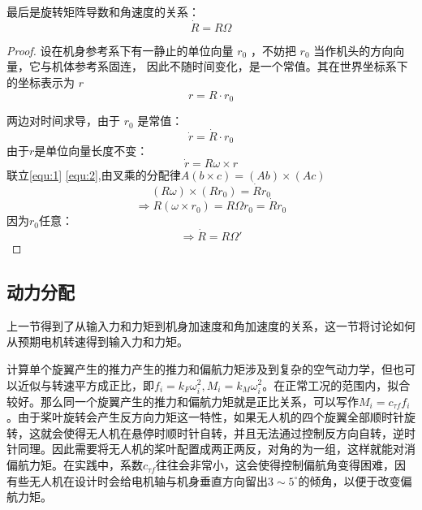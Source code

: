 最后是旋转矩阵导数和角速度的关系：
  \begin{equation}
    \dot R=R\Omega
    \label{equ:dotR}
  \end{equation}

\begin{proof}
  设在机身参考系下有一静止的单位向量 $r_0$ ，不妨把 $r_0$ 当作机头的方向向量，它与机体参考系固连，
  因此不随时间变化，是一个常值。其在世界坐标系下的坐标表示为 $r$ 
  $$r=R \cdot r_0$$
  
  两边对时间求导，由于 $r_0$ 是常值：
  \begin{equation}
    \dot r= \dot R \cdot r_0
    \label{equ:1}
  \end{equation}
  由于$r$是单位向量长度不变：
  \begin{equation}
    \dot r=R \omega \times r
    \label{equ:2}
  \end{equation}
  联立\ref{equ:1}  \ref{equ:2},由叉乘的分配律$A(b\times c)=(Ab)\times (Ac)$
  $$(R\omega)\times(Rr_0)=\dot R r_0$$
  $$\Rightarrow R(\omega \times r_0)=R\Omega r_0=\dot R r_0$$
  因为$r_0$任意：
  $$\Rightarrow \dot R=R \Omega'$$

\end{proof}

\subsection{动力分配}
上一节得到了从输入力和力矩到机身加速度和角加速度的关系，这一节将讨论如何从预期电机转速得到输入力和力矩。

计算单个旋翼产生的推力产生的推力和偏航力矩涉及到复杂的空气动力学，但也可以近似与转速平方成正比\cite{minimumsnap}，即$f_i=k_F \omega_i^2,M_i=k_M \omega_i^2$。在正常工况的范围内，拟合较好。那么同一个旋翼产生的推力和偏航力矩就是正比关系，可以写作$M_i=c_{\tau f}f_i$。由于桨叶旋转会产生反方向力矩这一特性，如果无人机的四个旋翼全部顺时针旋转，这就会使得无人机在悬停时顺时针自转，并且无法通过控制反方向自转，逆时针同理。因此需要将无人机的桨叶配置成两正两反，对角的为一组，这样就能对消偏航力矩。在实践中，系数$c_{\tau f}$往往会非常小，这会使得控制偏航角变得困难，因有些无人机在设计时会给电机轴与机身垂直方向留出$3\sim5^\circ$的倾角，以便于改变偏航力矩。

